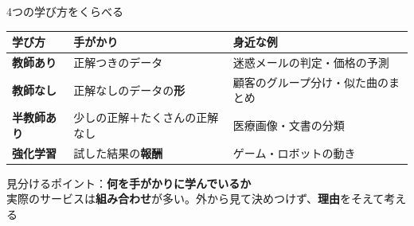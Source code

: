 \documentclass[aspectratio=169]{beamer}
\begin{document}
\begin{frame}{4つの学び方をくらべる}
\begin{center}
\renewcommand{\arraystretch}{1.5}
\small
\begin{tabular}{p{2.6cm}p{5.4cm}p{5.6cm}}
\toprule
\textbf{学び方} & \textbf{手がかり} & \textbf{身近な例}\\
\midrule
\colorbox{winter!15}{\textbf{教師あり}} & 正解つきのデータ & 迷惑メールの判定・価格の予測\\
\colorbox{gain!15}{\textbf{教師なし}} & 正解なしのデータの\textbf{形} & 顧客のグループ分け・似た曲のまとめ\\
\colorbox{gray!15}{\textbf{半教師あり}} & 少しの正解＋たくさんの正解なし & 医療画像・文書の分類\\
\colorbox{boom!15}{\textbf{強化学習}} & 試した結果の\textbf{報酬} & ゲーム・ロボットの動き\\
\bottomrule
\end{tabular}
\end{center}
\vspace{0.6em}
\centering\large 見分けるポイント：\textbf{何を手がかりに学んでいるか}\\[0.2em]
{\small 実際のサービスは\textbf{組み合わせ}が多い。外から見て決めつけず、\textbf{理由}をそえて考える}
\end{frame}



\end{document}
